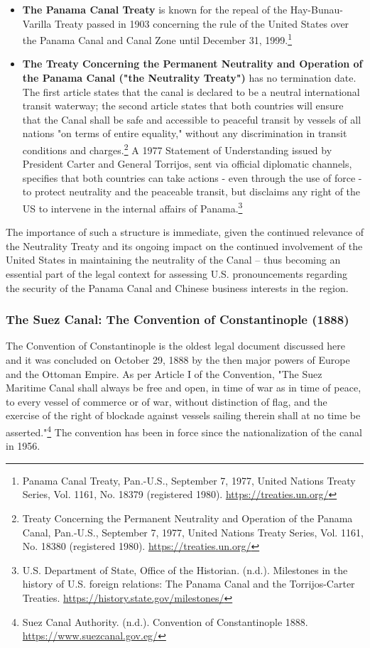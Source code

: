 \begin{itemize}
  \item \textbf{The Panama Canal Treaty} is known for the repeal of the Hay-Bunau-Varilla Treaty passed in 1903 concerning the rule of the United States over the Panama Canal and Canal Zone until December 31, 1999.\footnote{Panama Canal Treaty, Pan.-U.S., September 7, 1977, United Nations Treaty Series, Vol. 1161, No. 18379 (registered 1980). \url{https://treaties.un.org/}}
  \item \textbf{The Treaty Concerning the Permanent Neutrality and Operation of the Panama Canal ("the Neutrality Treaty")} has no termination date. The first article states that the canal is declared to be a neutral international transit waterway; the second article states that both countries will ensure that the Canal shall be safe and accessible to peaceful transit by vessels of all nations "on terms of entire equality," without any discrimination in transit conditions and charges.\footnote{Treaty Concerning the Permanent Neutrality and Operation of the Panama Canal, Pan.-U.S., September 7, 1977, United Nations Treaty Series, Vol. 1161, No. 18380 (registered 1980). \url{https://treaties.un.org/}} A 1977 Statement of Understanding issued by President Carter and General Torrijos, sent via official diplomatic channels, specifies that both countries can take actions - even through the use of force - to protect neutrality and the peaceable transit, but disclaims any right of the US to intervene in the internal affairs of Panama.\footnote{U.S. Department of State, Office of the Historian. (n.d.). Milestones in the history of U.S. foreign relations: The Panama Canal and the Torrijos-Carter Treaties. \url{https://history.state.gov/milestones/}}
\end{itemize}

The importance of such a structure is immediate, given the continued relevance of the Neutrality Treaty and its ongoing impact on the continued involvement of the United States in maintaining the neutrality of the Canal – thus becoming an essential part of the legal context for assessing U.S. pronouncements regarding the security of the Panama Canal and Chinese business interests in the region.

\subsubsection{The Suez Canal: The Convention of Constantinople (1888)}

The Convention of Constantinople is the oldest legal document discussed here and it was concluded on October 29, 1888 by the then major powers of Europe and the Ottoman Empire. As per Article I of the Convention, "The Suez Maritime Canal shall always be free and open, in time of war as in time of peace, to every vessel of commerce or of war, without distinction of flag, and the exercise of the right of blockade against vessels sailing therein shall at no time be asserted."\footnote{Suez Canal Authority. (n.d.). Convention of Constantinople 1888. \url{https://www.suezcanal.gov.eg/}} The convention has been in force since the nationalization of the canal in 1956.

